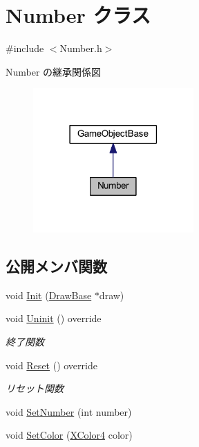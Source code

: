 \hypertarget{class_number}{}\section{Number クラス}
\label{class_number}


{\ttfamily \#include $<$Number.\+h$>$}



Number の継承関係図\nopagebreak
\begin{figure}[H]
\begin{center}
\leavevmode
\includegraphics[width=174pt]{class_number__inherit__graph}
\end{center}
\end{figure}
\subsection*{公開メンバ関数}
\begin{DoxyCompactItemize}
\item 
void \mbox{\hyperlink{class_number_ad92c9038810d0f831fdb9b5b13901b79}{Init}} (\mbox{\hyperlink{class_draw_base}{Draw\+Base}} $\ast$draw)
\item 
void \mbox{\hyperlink{class_number_a7c3bf9c55f7a0a19d80129c5f07f99f2}{Uninit}} () override
\begin{DoxyCompactList}\small\item\em 終了関数 \end{DoxyCompactList}\item 
void \mbox{\hyperlink{class_number_a7c6facdb1b3d0acc8309e0a915863d44}{Reset}} () override
\begin{DoxyCompactList}\small\item\em リセット関数 \end{DoxyCompactList}\item 
void \mbox{\hyperlink{class_number_ac825b1ee1f46a6ac4ffd3bc904964745}{Set\+Number}} (int number)
\item 
void \mbox{\hyperlink{class_number_a1ea98cdee888a040f4530a6654657c44}{Set\+Color}} (\mbox{\hyperlink{_vector3_d_8h_a680c30c4a07d86fe763c7e01169cd6cc}{X\+Color4}} color)
\end{DoxyCompactItemize}
